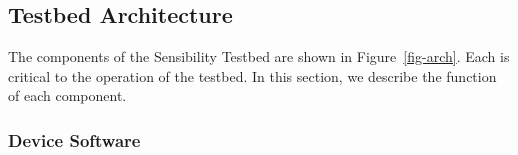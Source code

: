 

\subsection{Testbed Architecture}\label{sec-component}

The components of the Sensibility Testbed are shown in Figure~\ref{fig-arch}.
Each is critical to the operation of the testbed. 
In this section, we describe the function of each component.

\subsubsection{Device Software}\label{sec-repy}

